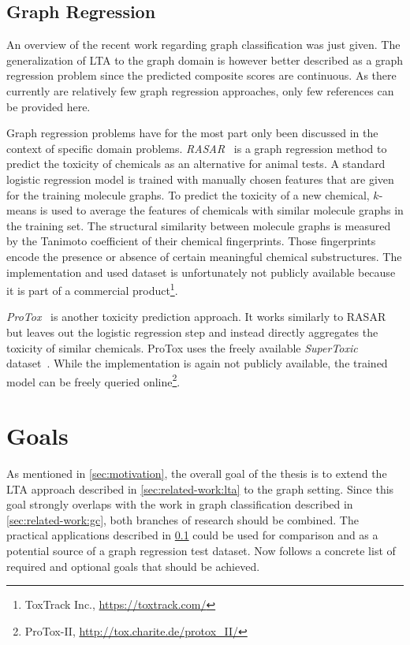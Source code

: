 \documentclass[12pt]{scrartcl}
\begin{document}
\subsection{Graph Regression}%
\label{sec:related-work:gr}

An overview of the recent work regarding graph classification was just given.
The generalization of LTA to the graph domain is however better described as a graph regression problem since the predicted composite scores are continuous.
As there currently are relatively few graph regression approaches, only few references can be provided here.

Graph regression problems have for the most part only been discussed in the context of specific domain problems.
\textit{RASAR}~\cite{Luechtefeld2018} is a graph regression method to predict the toxicity of chemicals as an alternative for animal tests.
A standard logistic regression model is trained with manually chosen features that are given for the training molecule graphs.
To predict the toxicity of a new chemical, $k$-means is used to average the features of chemicals with similar molecule graphs in the training set.
The structural similarity between molecule graphs is measured by the Tanimoto coefficient of their chemical fingerprints.
Those fingerprints encode the presence or absence of certain meaningful chemical substructures.
The implementation and used dataset is unfortunately not publicly available because it is part of a commercial product\footnote{ToxTrack Inc., \url{https://toxtrack.com/}}.

\textit{ProTox}~\cite{Drwal2014}\cite{Banerjee2018} is another toxicity prediction approach.
It works similarly to RASAR but leaves out the logistic regression step and instead directly aggregates the toxicity of similar chemicals.
ProTox uses the freely available \textit{SuperToxic} dataset~\cite{Schmidt2009}.
While the implementation is again not publicly available, the trained model can be freely queried online\footnote{ProTox-II, \url{http://tox.charite.de/protox_II/}}.

\section{Goals}%
\label{sec:goals}

As mentioned in \cref{sec:motivation}, the overall goal of the thesis is to extend the LTA approach described in \cref{sec:related-work:lta} to the graph setting.
Since this goal strongly overlaps with the work in graph classification described in \cref{sec:related-work:gc}, both branches of research should be combined.
The practical applications described in \cref{sec:related-work:gr} could be used for comparison and as a potential source of a graph regression test dataset.
Now follows a concrete list of required and optional goals that should be achieved.
\end{document}
